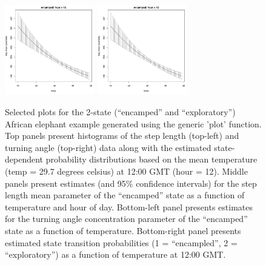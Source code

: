 \documentclass[12pt]{article}
\begin{document}
\begin{figure}[htbp]
  \includegraphics[width=0.35\textwidth,page=10]{plot_elephantResults}
  \includegraphics[width=0.35\textwidth,page=13]{plot_elephantResults} \\
  \caption{Selected plots for the 2-state (``encamped'' and ``exploratory'') African elephant example generated using the generic 'plot' function. Top panels present histograms of the step length (top-left) and turning angle (top-right) data along with the estimated state-dependent probability distributions based on the mean temperature (temp = 29.7 degrees celsius) at 12:00 GMT (hour = 12). Middle panels present estimates (and 95\% confidence intervals) for the step length mean parameter of the ``encamped'' state as a function of temperature and hour of day.  Bottom-left panel presents estimates for the turning angle concentration parameter of the ``encamped'' state as a function of temperature.  Bottom-right panel presents estimated state transition probabilities (1 = ``encampled'', 2 = ``exploratory'') as a function of temperature at 12:00 GMT.}
  \label{fig:elephantResults2}
\end{figure}
\end{document}
